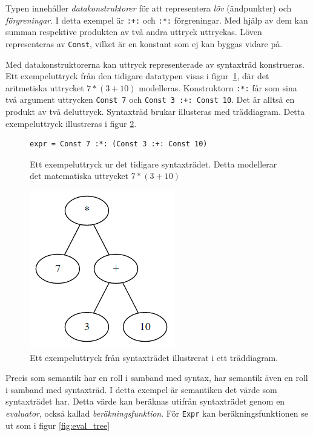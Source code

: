 Typen innehåller \textit{datakonstruktorer} för att representera
\textit{löv} (ändpunkter) och \textit{förgreningar}. I detta exempel är
\texttt{:+:} och \texttt{:*:} förgreningar. Med hjälp av dem kan summan respektive produkten av två andra uttryck uttryckas. Löven
representeras av
\texttt{Const}, vilket är en konstant som ej kan byggas vidare på.

Med datakonstruktorerna kan uttryck representerade av syntaxträd konstrueras. Ett exempeluttryck
från den tidigare datatypen visas i figur~\ref{fig:syntax_exempel_varde}, där det aritmetiska uttrycket $7 * (3
+ 10)$ modelleras. Konstruktorn \texttt{:*:} får som sina två argument uttrycken
\texttt{Const 7} och \texttt{Const 3 :+: Const 10}. Det är alltså en produkt av
två deluttryck. Syntaxträd brukar illusteras med träddiagram. Detta
exempeluttryck illustreras i figur \ref{fig:syntax_exempel_bild}.

\begin{figure}[tph]
  \begin{lstlisting}
expr = Const 7 :*: (Const 3 :+: Const 10)
  \end{lstlisting}
  \caption{Ett exempeluttryck ur det tidigare syntaxträdet. Detta modellerar det
           matematiska uttrycket $7 * (3 + 10)$}\label{fig:syntax_exempel_varde}
\end{figure}

\begin{figure}[tph]
  \centering
  \includegraphics[width=0.4\linewidth]{figure/syntax_exempel_bild.png}
  \caption{Ett exempeluttryck från syntaxträdet illustrerat i ett
           träddiagram.}\label{fig:syntax_exempel_bild}
\end{figure}

Precis som semantik har en roll i samband med syntax, har semantik även en roll
i samband med syntaxträd. I detta exempel är semantiken det värde som
syntaxträdet har. Detta värde kan beräknas utifrån syntaxträdet genom
en \textit{evaluator}, också kallad \textit{beräkningsfunktion}. För \texttt{Expr}
kan beräkningsfunktionen se ut som i figur \ref{fig:eval_tree}

